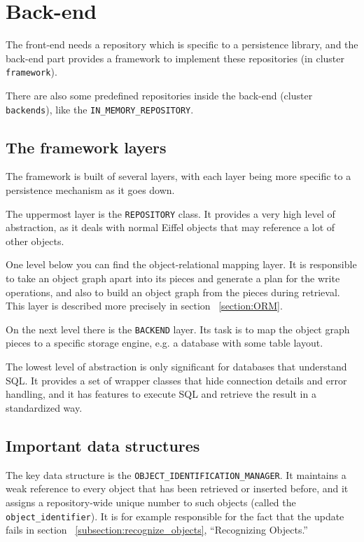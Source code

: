 \documentclass[a4paper,12pt]{report}
\begin{document}
\section{Back-end}

The front-end needs a repository which is specific to a persistence library, and the back-end part provides a framework to implement these repositories (in cluster \lstinline!framework!).

There are also some predefined repositories inside the back-end (cluster \lstinline!backends!), like the \lstinline!IN_MEMORY_REPOSITORY!.

\subsection{The framework layers}

The framework is built of several layers, with each layer being more specific to a persistence mechanism as it goes down.

The uppermost layer is the \lstinline!REPOSITORY! class. 
It provides a very high level of abstraction, as it deals with normal Eiffel objects that may reference a lot of other objects.

One level below you can find the object-relational mapping layer.
It is responsible to take an object graph apart into its pieces and generate a plan for the write operations, and also to build an object graph from the pieces during retrieval.
This layer is described more precisely in section ~\ref{section:ORM}.

On the next level there is the \lstinline!BACKEND! layer.
Its task is to map the object graph pieces to a specific storage engine, e.g. a database with some table layout.

The lowest level of abstraction is only significant for databases that understand SQL. 
It provides a set of wrapper classes that hide connection details and error handling, and it has features to execute SQL and retrieve the result in a standardized way.

\subsection{Important data structures}

The key data structure is the \lstinline!OBJECT_IDENTIFICATION_MANAGER!.
It maintains a weak reference to every object that has been retrieved or inserted before, and it assigns a repository-wide unique number to such objects (called the \lstinline!object_identifier!).
It is for example responsible for the fact that the update fails in section ~\ref{subsection:recognize_objects}, ``Recognizing Objects.''
\end{document}
